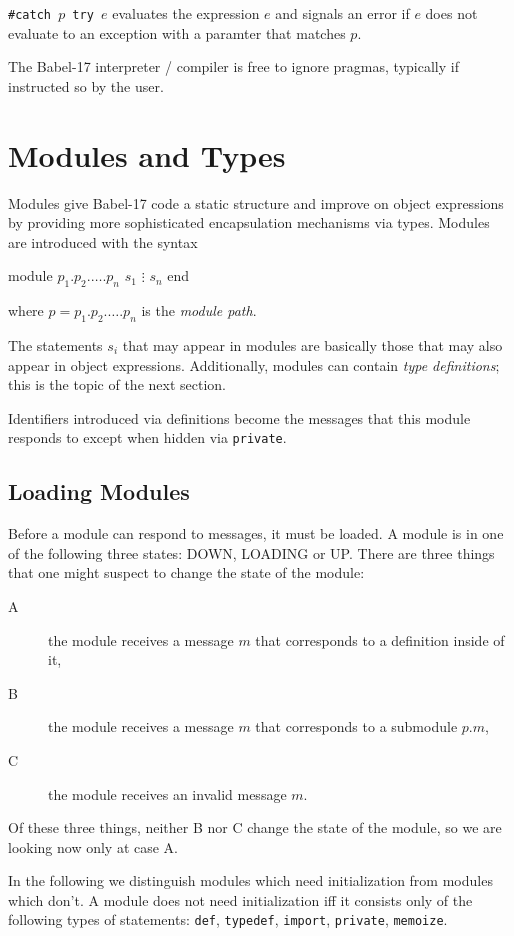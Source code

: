 \documentclass[11pt]{amsart}
\newcommand{\babelsrc}[1] {\lstinline!#1!}
\begin{document}
\texttt{\#catch $p$ try $e$} evaluates the expression $e$ and signals an error if $e$ does not evaluate to an exception with a paramter that matches $p$.


The Babel-17 interpreter / compiler is free to ignore pragmas, typically if instructed so by the user. 

\section{Modules and Types}\label{modules}
Modules give Babel-17 code a static structure and improve on object expressions by providing more sophisticated encapsulation mechanisms via types. Modules are introduced with the syntax
\begin{babellisting}
module $p_1.p_2.\ldots.p_n$
  $s_1$
  $\vdots$
  $s_n$  
end
\end{babellisting}
where $p = p_1.p_2.\ldots.p_n$ is the \emph{module path}. 

The statements $s_i$ that may appear in modules are basically those that may also appear in object expressions. Additionally, modules can contain \emph{type definitions}; this is the topic of the next section. 

Identifiers introduced via definitions become the messages that this module responds to except when hidden via \babelsrc{private}. 

\subsection{Loading Modules}
Before a module can respond to messages, it must be loaded. 
A module is in one of the following three states: DOWN, LOADING or UP. There are three things that one might  suspect to change the state of the module: 
\begin{description}
\item[A] the module receives a message $m$ that corresponds to a definition inside of it,
\item[B] the module receives a message $m$ that corresponds to a submodule $p.m$,
\item[C] the module receives an invalid message $m$.
\end{description}
Of these three things, neither B nor C change the state of the module, so we are looking now only at case A.

In the following we distinguish modules which need initialization from modules which don't. A module does not need initialization iff it consists only of the following types of statements: \babelsrc{def}, \babelsrc{typedef}, \babelsrc{import}, \babelsrc{private}, \babelsrc{memoize}. 
\end{document}
